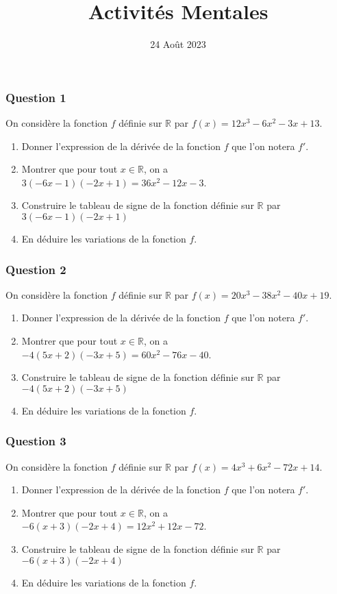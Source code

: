 \documentclass[15pt, mathserif]{beamer}
\title{Activités Mentales}
\date{24 Août 2023}
\newcommand{\R}{\mathbb{R}}			%
\begin{document}
\begin{frame}
    \titlepage
\end{frame}

\begin{frame} 
	\frametitle{Question 1}
On considère la fonction $f$ définie sur $\R$ par $f(x)=12x^3 -6x^2-3x+13$. \begin{enumerate} 
 	 \item Donner l'expression de la dérivée de la fonction $f$ que l'on notera $f'$. 
 	 \item Montrer que pour tout $x \in \R$, on a $3(-6x-1)(-2x+1)=36x^2-12x-3$. 
 	 \item Construire le tableau de signe de la fonction définie sur $\R$ par 
 \hfil$3(-6x-1)(-2x+1)$ 
 	 \item En déduire les variations de la fonction $f$. 
 
 \end{enumerate} 
 
 \end{frame}


\begin{frame} 
	\frametitle{Question 2}
On considère la fonction $f$ définie sur $\R$ par $f(x)=20x^3 -38x^2-40x+19$. \begin{enumerate} 
 	 \item Donner l'expression de la dérivée de la fonction $f$ que l'on notera $f'$. 
 	 \item Montrer que pour tout $x \in \R$, on a $-4(5x+2)(-3x+5)=60x^2-76x-40$. 
 	 \item Construire le tableau de signe de la fonction définie sur $\R$ par 
 \hfil$-4(5x+2)(-3x+5)$ 
 	 \item En déduire les variations de la fonction $f$. 
 
 \end{enumerate} 
 
 \end{frame}


\begin{frame} 
	\frametitle{Question 3}
On considère la fonction $f$ définie sur $\R$ par $f(x)=4x^3 +6x^2-72x+14$. \begin{enumerate} 
 	 \item Donner l'expression de la dérivée de la fonction $f$ que l'on notera $f'$. 
 	 \item Montrer que pour tout $x \in \R$, on a $-6(x+3)(-2x+4)=12x^2+12x-72$. 
 	 \item Construire le tableau de signe de la fonction définie sur $\R$ par 
 \hfil$-6(x+3)(-2x+4)$ 
 	 \item En déduire les variations de la fonction $f$. 
 
 \end{enumerate} 
 
 \end{frame}
\end{document}
